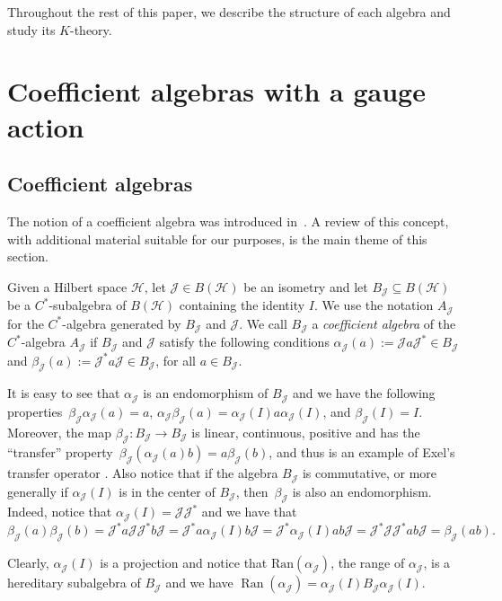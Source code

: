 \documentclass[10pt,a4paper]{amsart}
\DeclareMathOperator\Ran{Ran}
\newcommand{\jcal}{{\mathcal J}}
\numberwithin{equation}{section}
\begin{document}
Throughout the rest of this paper, we describe the structure of each algebra and study its $K$-theory.


\section{Coefficient algebras with a gauge action}\label{sec3}
\subsection{Coefficient algebras}
The notion of a coefficient algebra was introduced in~\cite{LO}. A review of this concept, with additional material suitable for our purposes, is the main theme of this section.

Given a Hilbert space $\mathcal{H}$, let ${\mathcal{J}} \in B(\mathcal{H})$ be an isometry and let $B_\jcal \subseteq B(\mathcal{H})$ be a $C^*$-subalgebra of $B(\mathcal{H})$ containing the identity $I$. We use the notation $A_{\mathcal{J}}$ for the $C^*$-algebra generated by $B_\jcal$ and ${\mathcal{J}}$. We call $B_\jcal$ a {\it coefficient algebra} of the $C^*$-algebra $A_{\mathcal{J}}$ if $B_\jcal$ and ${\mathcal{J}}$ satisfy the following conditions
$
\alpha_\jcal(a):={\mathcal{J}} a{\mathcal{J}}^* \in B_\jcal
$
and
$
\beta_\jcal(a):={\mathcal{J}}^*a{\mathcal{J}} \in B_\jcal$,
for all $a\in B_\jcal$.

It is easy to see that $\alpha_\jcal$ is an endomorphism of $B_\jcal$ and we have the following properties~${
\beta_\jcal\alpha_\jcal(a)=a}$, $ \alpha_\jcal\beta_\jcal(a)=\alpha_\jcal(I)a\alpha_\jcal(I)$, and $ \beta_\jcal(I)=I$.
Moreover, the map $\beta_\jcal\colon B_\jcal\to B_\jcal$ is linear, continuous, positive and has the ``transfer'' property~${
\beta_\jcal(\alpha_\jcal(a)b)=a\beta_\jcal(b)}$,
and thus is an example of Exel's transfer operator \cite{E}. Also notice that if the algebra $B_\jcal$ is commutative, or more generally if $\alpha_\jcal(I)$ is in the center of $B_\jcal$, then~$\beta_\jcal$ is also an endomorphism. Indeed, notice that $\alpha_\jcal(I) = \jcal\jcal^*$ and we have that
\begin{equation*}
\beta_\jcal(a)\beta_\jcal(b) = \jcal^*a\jcal\jcal^*b\jcal=\jcal^*a\alpha_\jcal(I)b\jcal=\jcal^*\alpha_\jcal(I)ab\jcal=\jcal^*\jcal\jcal^*ab\jcal=\beta_\jcal(ab) .
\end{equation*}

Clearly, $\alpha_\jcal(I)$ is a projection and notice that $\textrm{Ran}(\alpha_\jcal)$, the range of $\alpha_\jcal$, is a hereditary subalgebra of $B_\jcal$ and we have
$\Ran(\alpha_\jcal)=\alpha_\jcal(I)B_\jcal\alpha_\jcal(I)$.
\end{document}
